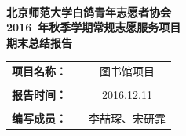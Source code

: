 \documentclass[nocover]{lizhechen}
\begin{document}
	
	\begin{center}
		\ 
		\\[20ex]
		{\heiti\huge \textbf{北京师范大学白鸽青年志愿者协会}}\\[3ex]
		{\heiti\huge \textbf{2016~年秋季学期常规志愿服务项目}}\\[3ex]
		{\heiti\huge \textbf{期末总结报告}}
		\\[70ex]
		\begin{table}[H]
			\begin{center}
				\begin{tabular}{ccc}
					{\Large \textbf{项目名称：}} & & {\Large 图书馆项目} \\
					 &  & \\
					{\Large \textbf{报告时间：}} & & {\Large 2016.12.11} \\
					 &  & \\
					{\Large \textbf{编写成员：}} & & {\Large 李喆琛、宋研霏} \\
				\end{tabular}
			\end{center}
		\end{table}
	\end{center}
	
\end{document}
